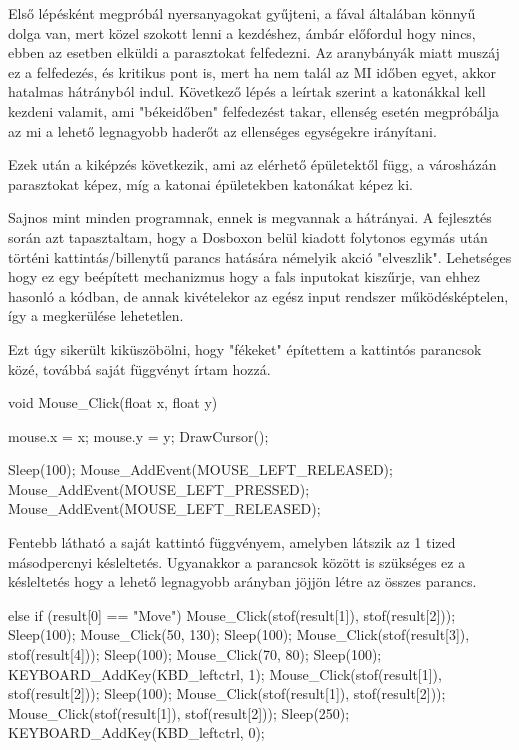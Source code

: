 Első lépésként megpróbál nyersanyagokat gyűjteni, a fával általában könnyű dolga van, mert közel szokott lenni a kezdéshez, ámbár előfordul hogy nincs, ebben az esetben elküldi a parasztokat felfedezni. Az aranybányák miatt muszáj ez a felfedezés, és kritikus pont is, mert ha nem talál az MI időben egyet, akkor hatalmas hátrányból indul. 
Következő lépés a leírtak szerint a katonákkal kell kezdeni valamit, ami "békeidőben" felfedezést takar, ellenség esetén megpróbálja az mi a lehető legnagyobb haderőt az ellenséges egységekre irányítani.  

Ezek után a kiképzés következik, ami az elérhető épületektől függ, a városházán parasztokat képez, míg a katonai épületekben katonákat képez ki.


Sajnos mint minden programnak, ennek is megvannak a hátrányai. A fejlesztés során azt tapasztaltam, hogy a Dosboxon belül kiadott folytonos egymás után történi kattintás/billenytű parancs hatására némelyik akció "elveszlik". Lehetséges hogy ez egy beépített mechanizmus hogy a fals inputokat kiszűrje, van ehhez hasonló a kódban, de annak kivételekor az egész input rendszer működésképtelen, így a megkerülése lehetetlen.

Ezt úgy sikerült kiküszöbölni, hogy "fékeket" építettem a kattintós parancsok közé, továbbá saját függvényt írtam hozzá.

\begin{cpp}
void Mouse_Click(float x, float y) {
    mouse.x = x;
    mouse.y = y;
    DrawCursor();
    
    Sleep(100);
    Mouse_AddEvent(MOUSE_LEFT_RELEASED);
    Mouse_AddEvent(MOUSE_LEFT_PRESSED);
    Mouse_AddEvent(MOUSE_LEFT_RELEASED);   
}
\end{cpp}

Fentebb látható a saját kattintó függvényem, amelyben látszik az 1 tized másodpercnyi késleltetés. Ugyanakkor a parancsok között is szükséges ez a késleltetés hogy a lehető legnagyobb arányban jöjjön létre az összes parancs.

\begin{cpp}
else if (result[0] == "Move")
{
    Mouse_Click(stof(result[1]), stof(result[2]));
    Sleep(100);
    Mouse_Click(50, 130);
    Sleep(100);
    Mouse_Click(stof(result[3]), stof(result[4]));
    Sleep(100);
    Mouse_Click(70, 80);
    Sleep(100);
    KEYBOARD_AddKey(KBD_leftctrl, 1);	
    Mouse_Click(stof(result[1]), stof(result[2]));
    Sleep(100);
    Mouse_Click(stof(result[1]), stof(result[2]));
    Mouse_Click(stof(result[1]), stof(result[2]));
    Sleep(250);
    KEYBOARD_AddKey(KBD_leftctrl, 0);
}
\end{cpp}

